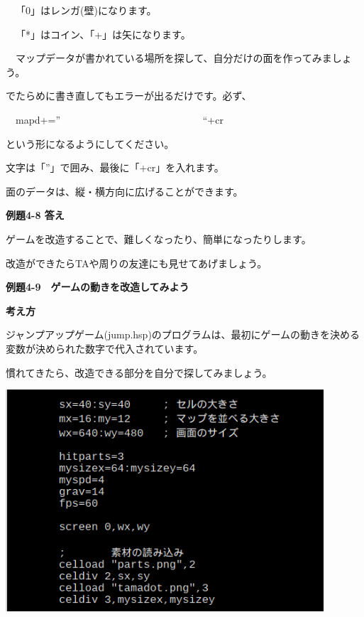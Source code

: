 \documentclass[a4paper,dvipdfmx]{jarticle}
\newcommand\textstyleqwerty[1]{#1}
\begin{document}
\bigskip


\bigskip


\bigskip


\bigskip


\bigskip


\bigskip

\ \ 「0」はレンガ(壁)になります。

\ \ 「*」はコイン、「+」は矢になります。

\ \ マップデータが書かれている場所を探して、自分だけの面を作ってみましょう。


\bigskip

でたらめに書き直してもエラーが出るだけです。必ず、


\bigskip

\ \ mapd+=” \ \ \ \ \ \ \ \ \ \ \ \ \ \ \ \ \ \ \ \ \ \ \ \ \ \ \ \ “+cr


\bigskip

という形になるようにしてください。

文字は「”」で囲み、最後に「+cr」を入れます。

面のデータは、縦・横方向に広げることができます。


\bigskip


\bigskip

{\bfseries
例題4-8 答え}


\bigskip

\textstyleqwerty{ゲームを改造することで、難しくなったり、簡単になったりします。}

改造ができたらTAや周りの友達にも見せてあげましょう。

\clearpage
\textstyleqwerty{\textbf{例題4-9　ゲームの動きを改造してみよう}}


\bigskip

{\bfseries
考え方}


\bigskip


\bigskip

ジャンプアップゲーム(jump.hsp)のプログラムは、最初にゲームの動きを決める変数が決められた数字で代入されています。

慣れてきたら、改造できる部分を自分で探してみましょう。



\begin{center}
\includegraphics[width=11.853cm,height=8.266cm]{text04-img/text04-img026.png}

\end{center}
\end{document}
